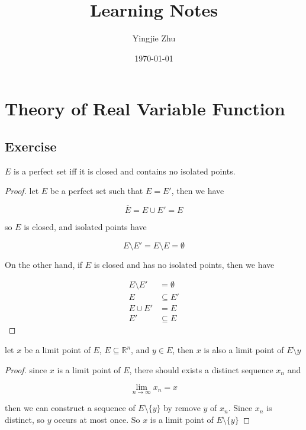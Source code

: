 \documentclass[11pt,a4paper]{article}
\title{Learning Notes}
\author{Yingjie Zhu}
\date{\today}
\begin{document}
\maketitle

\section{Theory of Real Variable Function}

\subsection{Exercise}

\begin{lem}
    $E$ is a perfect set iff it is closed and contains no isolated points.
\end{lem}

\begin{proof}
    let $E$ be a perfect set such that $E = E'$, then we have

    \[
        \overline{E} = E \cup E' = E
    \]

    so $E$ is closed, and isolated points have

    \[
        E \setminus E' = E \setminus E = \emptyset
    \]

    On the other hand, if $E$ is closed and has no isolated points, then we have

    \begin{align*}
        E \setminus E' &= \emptyset \\
        E & \subseteq E' \\ 
        E \cup E' &= E \\
        E' & \subseteq E
    \end{align*}
\end{proof}


\begin{lem}
    let $x$ be a limit point of $E$, $E \subseteq \mathbb{R}^n$, and $y \in E$, then $x$ is also a limit point of $E \setminus y$ 
\end{lem}

\begin{proof}
    since $x$ is a limit point of $E$, there should exists a distinct sequence $x_n$ and

    \[
        \lim_{n \to \infty}x_n = x
    \]

    then we can construct a sequence of $E \setminus \{ y \}$ by remove $y$ of $x_n$. Since $x_n$ 
    is distinct, so $y$ occurs at most once. So $x$ is a limit point of $E \setminus \{ y \}$
\end{proof}
\end{document}
